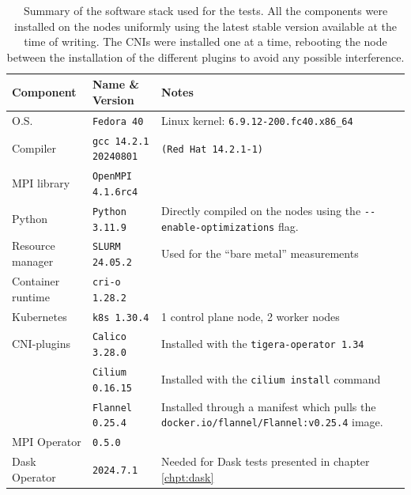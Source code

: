 \begin{table}[H]
  \centering
  \begin{tabularx}{\linewidth}{p{}p{}X}  %
    \toprule
    \textbf{Component} & \textbf{Name \& Version} & \textbf{Notes} \\
    \midrule
    O.S.              & \texttt{Fedora 40}           & Linux kernel: \texttt{6.9.12-200.fc40.x86\_64} \\
    Compiler          & \texttt{gcc 14.2.1 20240801} & \texttt{(Red Hat 14.2.1-1)}   \\
    MPI library       & \texttt{OpenMPI 4.1.6rc4}    &  \\
    Python            & \texttt{Python 3.11.9}       & Directly compiled on the nodes using the \newline \texttt{-}\texttt{-enable-optimizations} flag. \\
    Resource manager  & \texttt{SLURM 24.05.2}       & Used for the ``bare metal'' measurements \\
    Container runtime & \texttt{cri-o 1.28.2}        &  \\
    Kubernetes        & \texttt{k8s 1.30.4}          &  1 control plane node, 2 worker nodes\\
    CNI-plugins       & \texttt{Calico 3.28.0}       & Installed with the \texttt{tigera-operator 1.34} \\
    \                 & \texttt{Cilium 0.16.15}      & Installed with the \texttt{cilium install} command \\
                      & \texttt{Flannel 0.25.4}      & Installed through a manifest which pulls the \texttt{docker.io/flannel/Flannel:v0.25.4} image. \\
    MPI Operator      & \texttt{0.5.0}               &  \\
    Dask Operator     & \texttt{2024.7.1}            & Needed for Dask tests presented in chapter \ref{chpt:dask} \\
   \bottomrule
  \end{tabularx}
  \caption{Summary of the software stack used for the tests. All the components
    were installed on the nodes uniformly using the latest stable version
    available at the time of writing. The CNIs were installed one at a time,
    rebooting the node between the installation of the different plugins to
    avoid any possible interference.}
  \label{tab:softwarestack}
\end{table}

